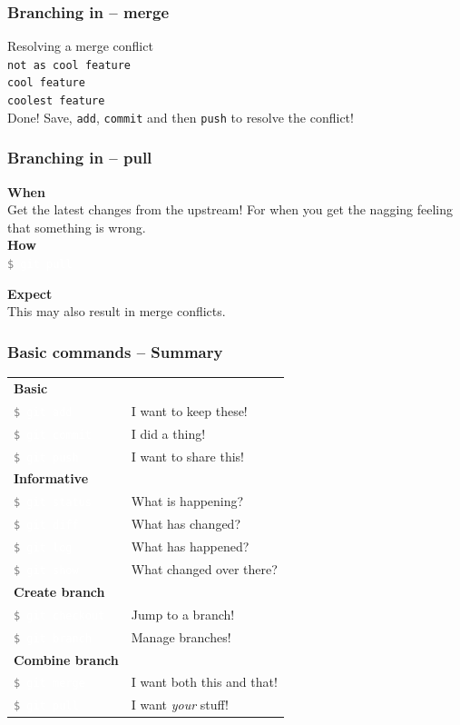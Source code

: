 \documentclass{beamer}
\def\arraystretch{1.2}%
\newcommand{\keyword}[1]{\hspace{-1.0em}\textcolor{lkblue}{\textbf{#1}}\vspace{0.2em}} %
\newcommand{\command}[1]{\colorbox{black!78}{\vphantom{Ep}\texttt{\textcolor{gray}{\$}
\textcolor{white}{#1}}}}
\begin{document}
\begin{frame}
  \frametitle{Branching in -- merge} %

    Resolving a merge conflict \\[1em]

        \texttt{not as cool feature} \\
        \texttt{cool feature} \\
        \texttt{coolest feature} \\[1em]
        Done! Save, \texttt{add}, \texttt{commit} and then \texttt{push} to
        resolve the conflict!
\end{frame}

\begin{frame}
  \frametitle{Branching in -- pull}
    \keyword{When}\\
    Get the latest changes from the upstream! For when you get the nagging feeling
    that something is wrong. \\[1em]

    \keyword{How}\\
    \command{git pull} \\[3em]

    \pause

    \keyword{Expect}\\
    This may also result in \textcolor{alertred}{merge conflicts}. \\[1em]
\end{frame}


\begin{frame}[fragile]
  \frametitle{Basic commands -- Summary}
{
\def\arraystretch{0.8}%
  \begin{tabular}{ll}
    \keyword{Basic} & \\[-0.25em]
    \command{git add} & I want to keep these! \\
    \command{git commit} & I did a thing! \\
    \command{git push} & I want to share this! \\[0.4em] %

    \keyword{Informative} & \\[-0.25em]
    \command{git status} & What is happening? \\
    \command{git diff} & What has changed? \\
    \command{git log} & What has happened? \\
    \command{git show} & What changed over there? \\[0.4em]

    \keyword{Create branch} & \\[-0.25em]
    \command{git checkout} & Jump to a branch! \\
    \command{git branch} & Manage branches! \\[0.4em]

    \keyword{Combine branch} & \\[-0.25em]
    \command{git merge} & I want both this and that! \\
    \command{git pull} & I want \emph{your} stuff! \\
  \end{tabular}
}
\end{frame}
\end{document}
